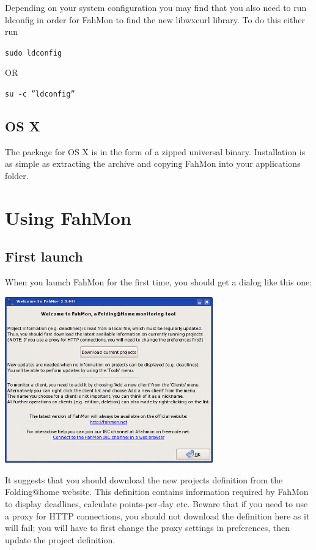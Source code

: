Depending on your system configuration you may find that you also need to run
ldconfig in order for FahMon to find the new libwxcurl library. To do this
either run

\texttt{sudo ldconfig}

OR

\texttt{su -c \textquotedblright ldconfig\textquotedblright}


\subsection{OS X}

The package for OS X is in the form of a zipped universal binary. Installation
is as simple as extracting the archive and copying FahMon into your applications
folder.


\section{Using FahMon}

\subsection{First launch}

When you launch FahMon for the first time, you should get a dialog like this
one:

\begin{center}
 \includegraphics[width=9cm]{1.png}
\end{center}


It suggests that you should download the new projects definition from the
Folding@home website. This definition contains information required by FahMon to
display deadlines, calculate points-per-day etc. Beware that if you need to use
a proxy for HTTP connections, you should not download the definition here as it
will fail; you will have to first change the proxy settings in preferences, then
update the project definition.


